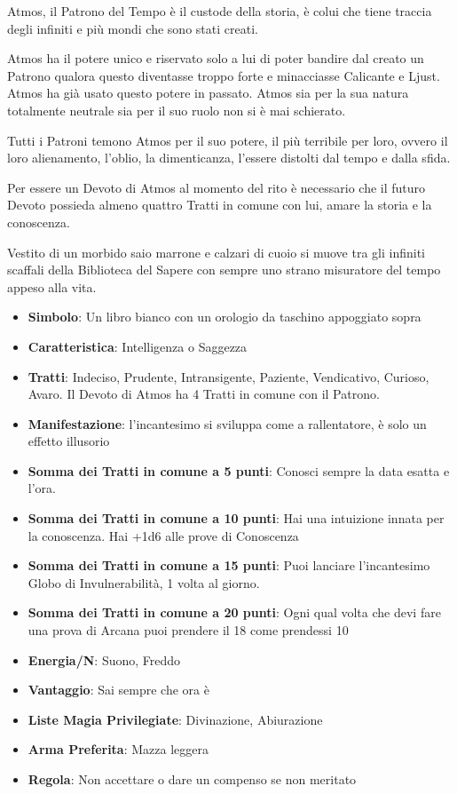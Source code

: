 \begin{multicols}{2}
Atmos, il Patrono del Tempo è il custode della storia, è colui che tiene traccia degli infiniti e più mondi che sono stati creati.

Atmos ha il potere unico e riservato solo a lui di poter bandire dal creato un Patrono qualora questo diventasse troppo forte e minacciasse Calicante e Ljust. Atmos ha già usato questo potere in passato. Atmos sia per la sua natura totalmente neutrale sia per il suo ruolo non si è mai schierato.

Tutti i Patroni temono Atmos per il suo potere, il più terribile per loro, ovvero il loro alienamento, l'oblio, la dimenticanza, l'essere distolti dal tempo e dalla sfida.

Per essere un Devoto di Atmos al momento del rito è necessario che il futuro Devoto possieda almeno quattro Tratti in comune con lui, amare la storia e la conoscenza.

Vestito di un morbido saio marrone e calzari di cuoio si muove tra gli infiniti scaffali della Biblioteca del Sapere con sempre uno strano misuratore del tempo appeso alla vita.


\begin{itemize}[leftmargin=*] \setlength{\itemsep}{0pt}
\item \textbf{Simbolo}: Un libro bianco con un orologio da taschino appoggiato sopra
\item \textbf{Caratteristica}: Intelligenza o Saggezza
\item \textbf{Tratti}: Indeciso, Prudente, Intransigente, Paziente, Vendicativo, Curioso, Avaro. Il Devoto di Atmos ha 4 Tratti in comune con il Patrono.
\item \textbf{Manifestazione}: l'incantesimo si sviluppa come a rallentatore, è solo un effetto illusorio
\item \textbf{Somma dei Tratti in comune a 5 punti}: Conosci sempre la data esatta e l'ora.
\item \textbf{Somma dei Tratti in comune a 10 punti}: Hai una intuizione innata per la conoscenza. Hai +1d6 alle prove di Conoscenza
\item \textbf{Somma dei Tratti in comune a 15 punti}: Puoi lanciare l'incantesimo Globo di Invulnerabilità, 1 volta al giorno.
\item \textbf{Somma dei Tratti in comune a 20 punti}: Ogni qual volta che devi fare una prova di Arcana puoi prendere il 18 come prendessi 10
\item \textbf{Energia/N}: Suono, Freddo
\item \textbf{Vantaggio}: Sai sempre che ora è
\item \textbf{Liste Magia Privilegiate}: Divinazione, Abiurazione
\item \textbf{Arma Preferita}: Mazza leggera
\item \textbf{Regola}: Non accettare o dare un compenso se non meritato
\end{itemize}


\end{multicols}

